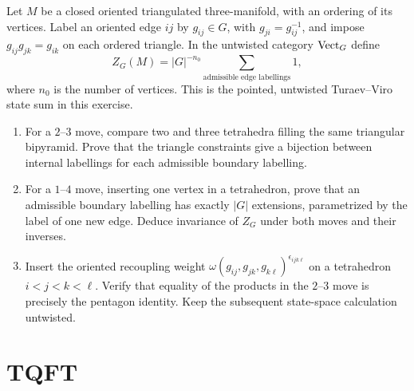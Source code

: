 \begin{exercise}
Let $M$ be a closed oriented triangulated three-manifold, with an
ordering of its vertices. Label an oriented edge $ij$ by $g_{ij}\in G$,
with $g_{ji}=g_{ij}^{-1}$, and impose $g_{ij}g_{jk}=g_{ik}$ on each
ordered triangle. In the untwisted category $\operatorname{Vect}_G$ define
\[
 Z_G(M)=|G|^{-n_0}
 \sum_{\text{admissible edge labellings}}1,
\]
where $n_0$ is the number of vertices. This is the pointed,
untwisted Turaev--Viro state sum in this exercise.
\begin{enumerate}[label=(\alph*)]
\item For a $2$--$3$ move, compare two and three tetrahedra filling
the same triangular bipyramid. Prove that the triangle constraints
give a bijection between internal labellings for each admissible
boundary labelling.
\item For a $1$--$4$ move, inserting one vertex in a tetrahedron,
prove that an admissible boundary labelling has exactly $|G|$
extensions, parametrized by the label of one new edge.
Deduce invariance of $Z_G$ under both moves and their inverses.
\item Insert the oriented recoupling weight
$\omega(g_{ij},g_{jk},g_{k\ell})^{\epsilon_{ijk\ell}}$
on a tetrahedron $i<j<k<\ell$. Verify that equality of the products
in the $2$--$3$ move is precisely the pentagon identity.
Keep the subsequent state-space calculation untwisted.
\end{enumerate}
\end{exercise}

\section{TQFT}


